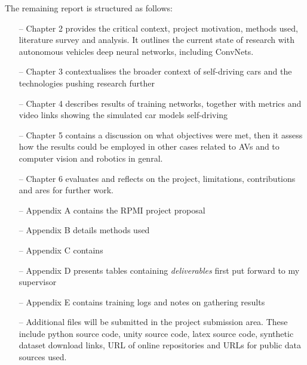 The remaining report is structured as follows:
\begin{itemize}
    \item[--] Chapter 2 provides the critical context, project motivation, methods used, literature survey and analysis. It outlines the current state of research with autonomous vehicles deep neural networks, including ConvNets.
    \item[--] Chapter 3 contextualises the broader context of self-driving cars and the technologies pushing research further
    \item[--] Chapter 4 describes results of training networks, together with metrics and video links showing the simulated car models self-driving
    \item[--] Chapter 5 contains a discussion on what objectives were met, then it assess how the results could be employed in other cases related to AVs and to computer vision and robotics in genral.
    \item[--] Chapter 6 evaluates and reflects on the project, limitations, contributions and ares for further work.
    \item[--] Appendix A contains the RPMI project proposal
    \item[--] Appendix B details methods used 
    \item[--] Appendix C contains
    \item[--] Appendix D presents tables containing \textit{deliverables} first put forward to my supervisor
    \item[--] Appendix E contains training logs and notes on gathering results
    \item[--] Additional files will be submitted in the project submission area. These include python source code, unity source code, latex source code, synthetic dataset download links, URL of online repositories and URLs for public data sources used.
\end{itemize}
